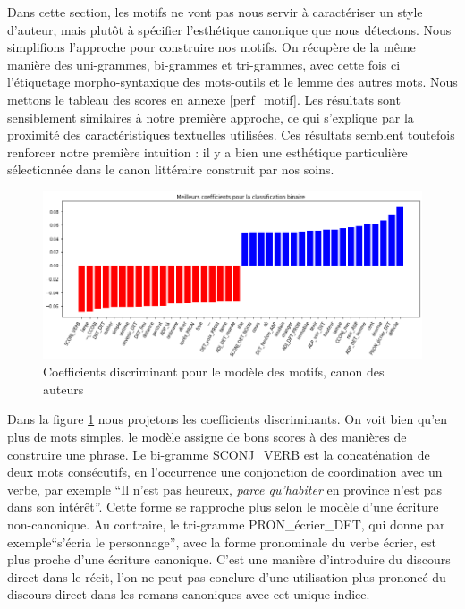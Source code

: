 Dans cette section, les motifs ne vont pas nous servir à caractériser un style d'auteur, mais plutôt à spécifier l'esthétique canonique que nous détectons. Nous simplifions l'approche pour construire nos motifs. On récupère de la même manière des uni-grammes, bi-grammes et tri-grammes, avec cette fois ci l'étiquetage morpho-syntaxique des mots-outils et le lemme des autres mots. 
Nous mettons le tableau des scores en annexe \ref{perf_motif}. Les résultats sont sensiblement similaires à notre première approche, ce qui s'explique par la proximité des caractéristiques textuelles utilisées. Ces résultats semblent toutefois renforcer notre première intuition : il y a bien une esthétique particulière sélectionnée dans le canon littéraire construit par nos soins. 

\bigskip
\begin{figure}[!ht]
    \centering
    \includegraphics[width=17cm]{img/14_coefs_motifs.png}
    \caption{Coefficients discriminant pour le modèle des motifs, canon des auteurs}
    \label{coefs_motifs}
\end{figure}

Dans la figure \ref{coefs_motifs} nous projetons les coefficients discriminants. On voit bien qu'en plus de mots simples, le modèle assigne de bons scores à des manières de construire une phrase. Le bi-gramme SCONJ\_VERB est la concaténation de deux mots consécutifs, en l'occurrence une conjonction de coordination avec un verbe, par exemple \enquote{Il n'est pas heureux, \textit{parce qu'habiter} en province n'est pas dans son intérêt}. Cette forme se rapproche plus selon le modèle d'une écriture non-canonique. Au contraire, le tri-gramme PRON\_écrier\_DET, qui donne par exemple\enquote{s'écria le personnage}, avec la forme pronominale du verbe écrier, est plus proche d'une écriture canonique. C'est une manière d'introduire du discours direct dans le récit, l'on ne peut pas conclure d'une utilisation plus prononcé du discours direct dans les romans canoniques avec cet unique indice.

